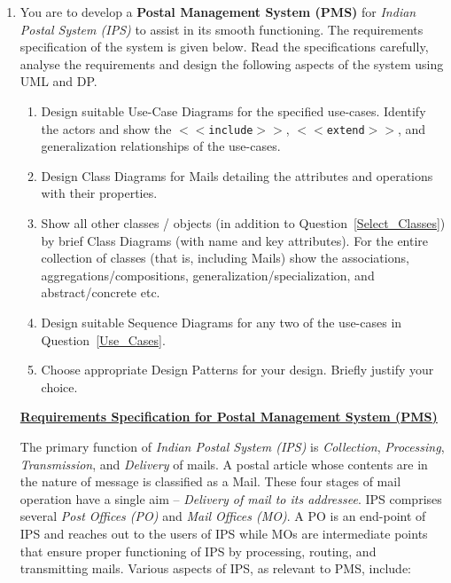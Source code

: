 \documentclass{article}
\begin{document}
\begin{enumerate}
\item You are to develop a {\bf Postal Management System (PMS)} for {\em Indian Postal System (IPS)} to assist in its smooth functioning. The requirements specification of the system is given below. Read the specifications carefully, analyse the requirements and design the following aspects of the system using UML and DP. 
\begin{enumerate}
\item \label{Use_Cases} Design suitable Use-Case Diagrams for the specified use-cases. Identify the actors and show the \texttt{$<<$include$>>$}, \texttt{$<<$extend$>>$}, and generalization relationships of the use-cases. %
\item \label{Select_Classes} Design Class Diagrams for Mails detailing the attributes and operations with their properties. %
\item Show all other classes / objects (in addition to Question~\ref{Select_Classes}) by brief Class Diagrams (with name and key attributes). For the entire collection of classes (that is, including Mails) show the associations, aggregations/compositions, generalization/specialization, and abstract/concrete etc. %
\item Design suitable Sequence Diagrams for any two of the use-cases in Question~\ref{Use_Cases}. %
\item Choose appropriate Design Patterns for your design. Briefly justify your choice. %
\end{enumerate}

\begin{center}
{\bf \underline{Requirements Specification for Postal Management System (PMS)}}
\end{center}

The primary function of {\em Indian Postal System (IPS)} is {\em Collection}, {\em Processing}, {\em Transmission}, and {\em Delivery} of mails. A postal article whose contents are in the nature of message is classified as a Mail. These four stages of mail operation have a single aim -- {\em Delivery of mail to its addressee}. IPS comprises several {\em Post Offices (PO)} and {\em Mail Offices (MO)}. A PO is an end-point of IPS and reaches out to the users of IPS while MOs are intermediate points that ensure proper functioning of IPS by processing, routing, and transmitting mails. Various aspects of IPS, as relevant to PMS, include:


\end{enumerate}
\end{document}
